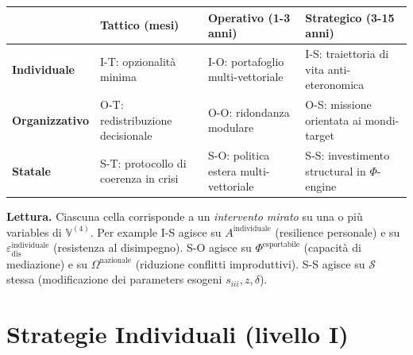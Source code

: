 {\def\LTcaptype{none} %
{\small\begin{longtable}[]{@{}
  >{\raggedright\arraybackslash}p{}
  >{\raggedright\arraybackslash}p{}
  >{\raggedright\arraybackslash}p{}
  >{\raggedright\arraybackslash}p{}@{}}
\toprule\noalign{}
\begin{minipage}[b]{\linewidth}\raggedright
\end{minipage} & \begin{minipage}[b]{\linewidth}\raggedright
\textbf{Tattico} (mesi)
\end{minipage} & \begin{minipage}[b]{\linewidth}\raggedright
\textbf{Operativo} (1-3 anni)
\end{minipage} & \begin{minipage}[b]{\linewidth}\raggedright
\textbf{Strategico} (3-15 anni)
\end{minipage} \\
\midrule\noalign{}
\endhead
\bottomrule\noalign{}
\endlastfoot
\textbf{Individuale} & I-T: opzionalità minima & I-O: portafoglio
multi-vettoriale & I-S: traiettoria di vita anti-eteronomica \\
\textbf{Organizzativo} & O-T: redistribuzione decisionale & O-O:
ridondanza modulare & O-S: missione orientata ai mondi-target \\
\textbf{Statale} & S-T: protocollo di coerenza in crisi & S-O: politica
estera multi-vettoriale & S-S: investimento structural in
\(\Phi\)-engine \\
\end{longtable}}
}

\Proved{} \textbf{Lettura.} Ciascuna cella corrisponde a un
\emph{intervento mirato} su una o più variables di \(\mathbb{V}^{(4)}\).
Per example I-S agisce su \(A^{\text{individuale}}\) (resilience
personale) e su \(\varepsilon_{\text{dis}}^{\text{individuale}}\)
(resistenza al disimpegno). S-O agisce su \(\Phi^{\text{esportabile}}\)
(capacità di mediazione) e su \(\Omega^{\text{nazionale}}\) (riduzione
conflitti improduttivi). S-S agisce su \(\mathcal{S}\) stessa
(modificazione dei parameters esogeni \(s_{iii}, z, \delta\)).



\section{Strategie Individuali (livello
I)}\label{strategie-individuali-livello-i}

